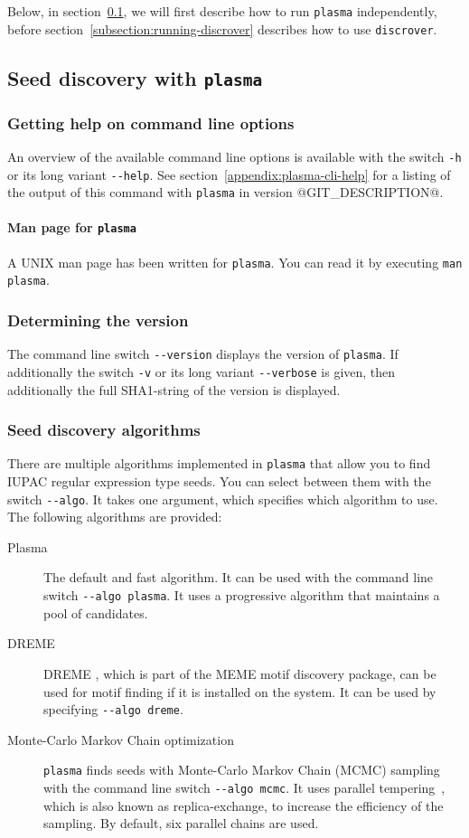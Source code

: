 \documentclass[a4paper]{article}
\makeatletter
\newcommand{\plasma}[0]{\texttt{plasma}}
\newcommand{\discrover}[0]{\texttt{discrover}}
\newcommand{\version}[0]{@GIT_DESCRIPTION@}
\makeatother
\begin{document}
Below, in section~\ref{subsection:running-plasma}, we will first describe how to run \plasma{} independently, before section~\ref{subsection:running-discrover} describes how to use \discrover{}.

\subsection{Seed discovery with \plasma{}}
\label{subsection:running-plasma}
\subsubsection{Getting help on command line options}
An overview of the available command line options is available with the switch \verb|-h| or its long variant \verb|--help|.
See section~\ref{appendix:plasma-cli-help} for a listing of the output of this command with \plasma{} in version \version{}.

\paragraph{Man page for \plasma{}}
A UNIX man page has been written for \plasma{}.
You can read it by executing \verb|man plasma|.

\subsubsection{Determining the version}
The command line switch \verb|--version| displays the version of \plasma{}.
If additionally the switch \verb|-v| or its long variant \verb|--verbose| is given, then additionally the full SHA1-string of the version is displayed.

\subsubsection{Seed discovery algorithms}
\label{section:plasma-MCMC}
There are multiple algorithms implemented in \plasma{} that allow you to find IUPAC regular expression type seeds.
You can select between them with the switch \verb|--algo|.
It takes one argument, which specifies which algorithm to use.
The following algorithms are provided:
\begin{description}
  \item[Plasma]
    The default and fast algorithm.
    It can be used with the command line switch \verb|--algo plasma|.
    It uses a progressive algorithm that maintains a pool of candidates.
  \item[DREME]
    DREME \cite{Bailey2011}, which is part of the MEME motif discovery package, can be used for motif finding if it is installed on the system.
    It can be used by specifying \verb|--algo dreme|.
  \item[Monte-Carlo Markov Chain optimization]
    \plasma{} finds seeds with Monte-Carlo Markov Chain (MCMC) sampling with the command line switch \verb|--algo mcmc|.
    It uses parallel tempering~\cite{Earl2005}, which is also known as replica-exchange, to increase the efficiency of the sampling.
    By default, six parallel chains are used.
\end{description}
\end{document}
